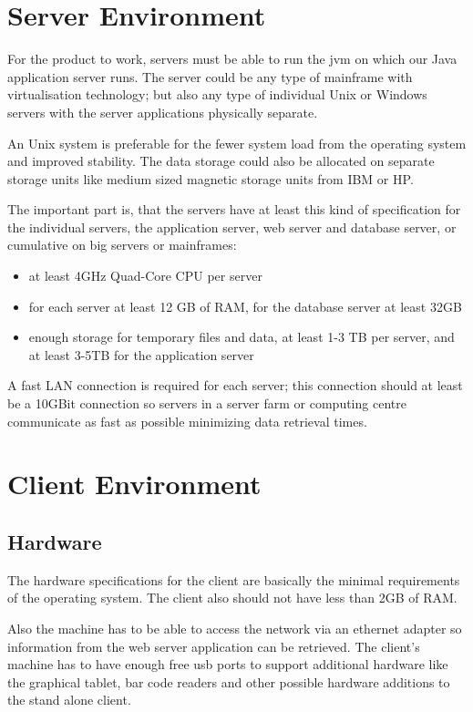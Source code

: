 \documentclass[11pt,a4paper,oneside,svgnames]{report}
\begin{document}
\section{Server Environment}
For the product to work, servers must be able to run the \gls{jvm} on which our Java application server runs. The server could be any type of mainframe with virtualisation technology; but also any type of individual Unix or Windows servers with the server applications physically separate.

An Unix system is preferable for the fewer system load from the operating system and improved stability. The data storage could also be allocated on separate storage units like medium sized magnetic storage units from IBM or HP.

The important part is, that the servers have at least this kind of specification for the individual servers, the application server, web server and database server, or cumulative on big servers or mainframes:

\begin{itemize}
	\item at least 4GHz Quad-Core CPU per server
	\item for each server at least 12 GB of RAM, for the database server at least 32GB
	\item enough storage for temporary files and data, at least 1-3 TB per server, and at least 3-5TB for the application server
\end{itemize}

A fast LAN connection is required for each server; this connection should at least be a 10GBit connection so servers in a server farm or computing centre communicate as fast as possible minimizing data retrieval times.

\section{Client Environment}
\subsection{Hardware}
The hardware specifications for the client are basically the minimal requirements of the operating system. The client also should not have less than 2GB of RAM.

Also the machine has to be able to access the network via an ethernet adapter so information from the web server application can be retrieved. The client's machine has to have enough free usb ports to support additional hardware like the graphical tablet, bar code readers and other possible hardware additions to the stand alone client.
\end{document}
